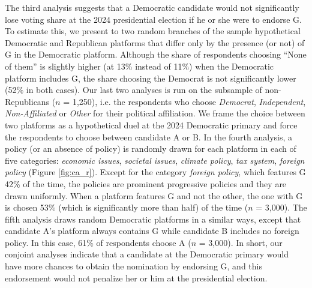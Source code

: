\documentclass{nature}
\begin{document}
The third analysis suggests that a Democratic candidate would not significantly lose voting share at the 2024 presidential election if he or she were to endorse G. To estimate this, we present to two random branches of the sample hypothetical Democratic and Republican platforms that differ only by the presence (or not) of G in the Democratic platform. Although the share of respondents choosing ``None of them'' is slightly higher (at 13\% instead of 11\%) when the Democratic platform includes G, the share choosing the Democrat is not significantly lower (52\% in both cases). Our last two analyses is run on the subsample of non-Republicans ($n$ = 1,250), i.e. the respondents who choose \textit{Democrat}, \textit{Independent}, \textit{Non-Affiliated} or \textit{Other} for their political affiliation. We frame the choice between two platforms as a hypothetical duel at the 2024 Democratic primary and force the respondents to choose between candidate A or B. In the fourth analysis, a policy (or an absence of policy) is randomly drawn for each platform in each of five categories: \textit{economic issues}, \textit{societal issues}, \textit{climate policy}, \textit{tax system}, \textit{foreign policy} (Figure \ref{fig:ca_r}). Except for the category \textit{foreign policy}, which features G 42\% of the time, the policies are prominent progressive policies and they are drawn uniformly. %
When a platform features G and not the other, the one with G is chosen 53\% (which is significantly more than half) of the time ($n$ = 3,000). %
The fifth analysis draws random Democratic platforms in a similar ways, except that candidate A's platform always contains G while candidate B includes no foreign policy. In this case, 61\% of respondents choose A ($n$ = 3,000). In short, our conjoint analyses indicate that a candidate at the Democratic primary would have more chances to obtain the nomination by endorsing G, and this endorsement would not penalize her or him at the presidential election. %
\end{document}
